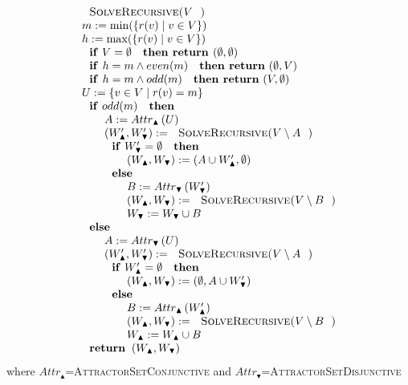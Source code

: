 \begin{equation*}
\begin{array}{l}
\text{\textsc{SolveRecursive(}}V\text{\textsc{)}} \\ 
m:=\min (\{r(v)\mid v\in V\}) \\ 
h:=\max (\{r(v)\mid v\in V\}) \\ 
\text{\textbf{if} }V=\emptyset \text{ \textbf{then return }}(\emptyset
,\emptyset ) \\ 
\text{\textbf{if }}h=m\wedge even(m)\text{ \textbf{then return} }(\emptyset
,V) \\ 
\text{\textbf{if }}h=m\wedge odd(m)\text{ \textbf{then return} }(V,\emptyset
) \\ 
U:=\{v\in V\mid r(v)=m\} \\ 
\text{\textbf{if} }odd(m)\text{ \textbf{then}} \\ 
\qquad A:=Attr_{\blacktriangle }\left( U\right)  \\ 
\qquad \left( W_{\blacktriangle }^{\prime },W_{\blacktriangledown }^{\prime
}\right) :=\text{\textsc{SolveRecursive(}}V\setminus A\text{)} \\ 
\qquad \text{\textbf{if} }W_{\blacktriangledown }^{\prime }=\emptyset \text{ 
\textbf{then}} \\ 
\qquad \qquad \left( W_{\blacktriangle },W_{\blacktriangledown }\right)
:=\left( A\cup W_{\blacktriangle }^{\prime },\emptyset \right)  \\ 
\qquad \text{\textbf{else}} \\ 
\qquad \qquad B:=Attr_{\blacktriangledown }\left( W_{\blacktriangledown
}^{\prime }\right)  \\ 
\qquad \qquad \left( W_{\blacktriangle },W_{\blacktriangledown }\right) :=%
\text{\textsc{SolveRecursive(}}V\setminus B\text{)} \\ 
\qquad \qquad W_{\blacktriangledown }:=W_{\blacktriangledown }\cup B \\ 
\text{\textbf{else}} \\ 
\qquad A:=Attr_{\blacktriangledown }\left( U\right)  \\ 
\qquad \left( W_{\blacktriangle }^{\prime },W_{\blacktriangledown }^{\prime
}\right) :=\text{\textsc{SolveRecursive(}}V\setminus A\text{)} \\ 
\qquad \text{\textbf{if} }W_{\blacktriangle }^{\prime }=\emptyset \text{ 
\textbf{then}} \\ 
\qquad \qquad \left( W_{\blacktriangle },W_{\blacktriangledown }\right)
:=\left( \emptyset ,A\cup W_{\blacktriangledown }^{\prime }\right)  \\ 
\qquad \text{\textbf{else}} \\ 
\qquad \qquad B:=Attr_{\blacktriangle }\left( W_{\blacktriangle }^{\prime
}\right)  \\ 
\qquad \qquad \left( W_{\blacktriangle },W_{\blacktriangledown }\right) :=%
\text{\textsc{SolveRecursive(}}V\setminus B\text{)} \\ 
\qquad \qquad W_{\blacktriangle }:=W_{\blacktriangle }\cup B \\ 
\text{\textbf{return }}\left( W_{\blacktriangle },W_{\blacktriangledown
}\right) 
\end{array}%
\end{equation*}%
where $Attr_{\blacktriangle }$=\textsc{AttractorSetConjunctive} and $%
Attr_{\blacktriangledown }$=\textsc{AttractorSetDisjunctive}

\newpage
